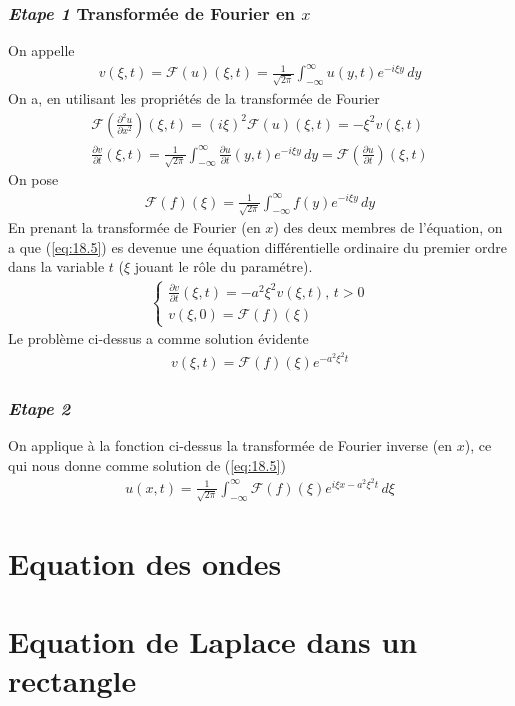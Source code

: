 \subsubsection{\emph{Etape 1} Transformée de Fourier en $x$}
On appelle
\begin{eqnarray}
	v(\xi,t)=\mathcal F(u)(\xi,t)=\frac{1}{\sqrt{2\pi}}\int_{-\infty}^{\infty}u(y,t)e^{-i\xi y}\,dy
\end{eqnarray}
On a, en utilisant les propriétés de la transformée de Fourier
\begin{eqnarray}
	\mathcal F(\frac{\partial^2 u}{\partial x^2})(\xi,t)=(i\xi)^2\mathcal F(u)(\xi,t)=-\xi^2v(\xi,t)
	\\
	\frac{\partial v}{\partial t}(\xi,t)=\frac{1}{\sqrt{2\pi}}\int_{-\infty}^{\infty}\frac{\partial u}{\partial t}(y,t)e^{-i\xi y}\,dy=\mathcal F(\frac{\partial u}{\partial t})(\xi,t)
\end{eqnarray}
On pose
\begin{eqnarray}
	\mathcal F(f)(\xi)=\frac{1}{\sqrt{2\pi}}\int_{-\infty}^{\infty}f(y)e^{-i\xi y}\,dy
\end{eqnarray}
En prenant la transformée de Fourier (en $x$) des deux membres de l'équation, on a que (\ref{eq:18.5}) es devenue une équation différentielle ordinaire du premier ordre dans la variable $t$ ($\xi$ jouant le rôle du paramétre).
\begin{eqnarray}
	\begin{cases}
		\frac{\partial v}{\partial t}(\xi,t)=-a^2\xi^2v(\xi,t),\,t>0
		\\
		v(\xi,0)=\mathcal F(f)(\xi)
	\end{cases}
\end{eqnarray}
Le problème ci-dessus a comme solution évidente
\begin{eqnarray}
	v(\xi,t)=\mathcal F(f)(\xi)e^{-a^2\xi^2t}
\end{eqnarray}

\subsubsection{\emph{Etape 2}} 
On applique à la fonction ci-dessus la transformée de Fourier inverse (en $x$), ce qui nous donne comme solution de (\ref{eq:18.5})
\begin{eqnarray}
	u(x,t)=\frac{1}{\sqrt{2\pi}}\int_{-\infty}^{\infty}\mathcal F(f)(\xi)e^{i\xi x-a^2\xi^2t}\,d\xi
\end{eqnarray}



\section{Equation des ondes}

\section{Equation de Laplace dans un rectangle}

